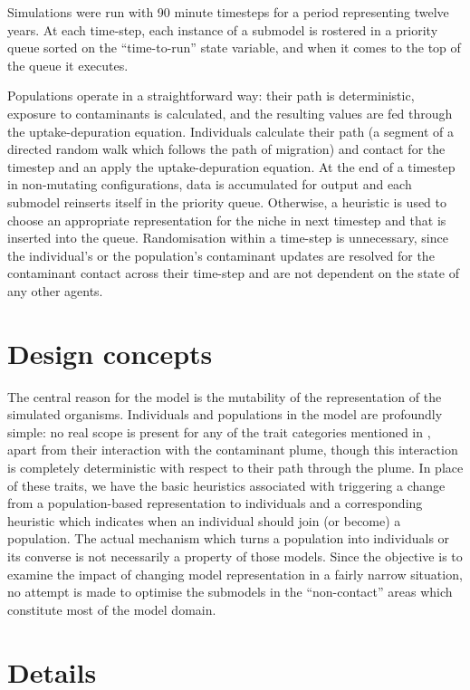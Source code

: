 Simulations were run with 90 minute timesteps for a period representing twelve
years. At each time-step, each instance of a submodel is rostered in a
priority queue sorted on the ``time-to-run'' state variable, and when it comes
to the top of the queue it executes.

Populations operate in a straightforward way: their path is deterministic,
exposure to contaminants is calculated, and the resulting values are fed
through the uptake-depuration equation. Individuals calculate their path (a
segment of a directed random walk which follows the path of migration) and
contact for the timestep and an apply the uptake-depuration equation. At the
end of a timestep in non-mutating configurations, data is accumulated for
output and each submodel reinserts itself in the priority queue. Otherwise, a
heuristic is used to choose an appropriate representation for the niche in
next timestep and that is inserted into the queue. Randomisation within a
time-step is unnecessary, since the individual's or the population's
contaminant updates are resolved for the contaminant contact across their
time-step and are not dependent on the state of any other agents.

\section{Design concepts}

The central reason for the model is the mutability of the representation of
the simulated organisms. Individuals and populations in the model are
profoundly simple: no real scope is present for any of the trait categories
mentioned in \citet{Grimm06:1}, apart from their interaction with the
contaminant plume, though this interaction is completely deterministic with
respect to their path through the plume. In place of these traits, we have the
basic heuristics associated with triggering a change from a population-based
representation to individuals and a corresponding heuristic which indicates
when an individual should join (or become) a population. The actual mechanism
which turns a population into individuals or its converse is not necessarily a
property of those models. Since the objective is to examine the impact of
changing model representation in a fairly narrow situation, no attempt is made
to optimise the submodels in the ``non-contact'' areas which constitute most
of the model domain.

\section{Details}

